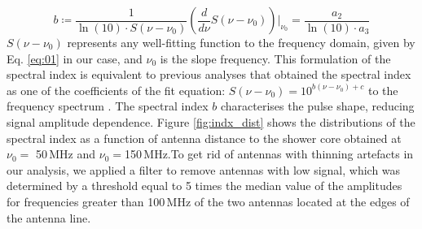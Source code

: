 \begin{equation}\label{eq:02}
    b  \coloneqq \frac{1}{\ln(10)\cdot S(\nu-\nu_0)} \left(\frac{d}{d\nu}S(\nu-\nu_0)\right)\biggr\rvert_{\nu_0}=\frac{a_2}{\ln(10)\cdot a_3}
\end{equation}
$S(\nu-\nu_0)$ represents any well-fitting function to the frequency domain, given by  Eq. \ref{eq:01} in our case, and $\nu _0$ is the slope frequency. This formulation of the spectral index is equivalent to previous analyses that obtained the spectral index as one of the coefficients of the fit equation: $S(\nu-\nu_0)=10^{b(\nu-\nu_0) + c}$ to the frequency spectrum \cite{Jansen:2016sjo}. The spectral index $b$ characterises the pulse shape, reducing signal amplitude dependence. 
Figure \ref{fig:indx_dist} shows the distributions of the spectral index as a function of antenna distance to the shower core obtained at $\nu_0=$ 50\,MHz and $\nu_0=$150\,MHz.To get rid of antennas with thinning artefacts in our analysis, we applied a filter to remove antennas with low signal, which was determined by a threshold equal to 5 times the median value of the amplitudes for frequencies greater than 100\,MHz of the two antennas located at the edges of the antenna line.
